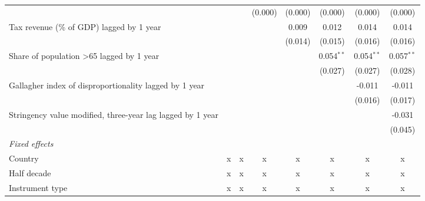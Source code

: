 \begin{tabular}{lccccccc}
                                                                                          &         &         & (0.000)      & (0.000)      & (0.000)      & (0.000)      & (0.000)\\   
   Tax revenue (\% of GDP) lagged by 1 year                                               &         &         &              & 0.009        & 0.012        & 0.014        & 0.014\\   
                                                                                          &         &         &              & (0.014)      & (0.015)      & (0.016)      & (0.016)\\   
   Share of population >65 lagged by 1 year                                               &         &         &              &              & 0.054$^{**}$ & 0.054$^{**}$ & 0.057$^{**}$\\   
                                                                                          &         &         &              &              & (0.027)      & (0.027)      & (0.028)\\   
   Gallagher index of disproportionality lagged by 1 year                                 &         &         &              &              &              & -0.011       & -0.011\\   
                                                                                          &         &         &              &              &              & (0.016)      & (0.017)\\   
   Stringency value modified, three-year lag lagged by 1 year                             &         &         &              &              &              &              & -0.031\\   
                                                                                          &         &         &              &              &              &              & (0.045)\\   
   \emph{Fixed effects}\\
   Country                                                                                & x       & x       & x            & x            & x            & x            & x\\  
   Half decade                                                                            & x       & x       & x            & x            & x            & x            & x\\  
   Instrument type                                                                        & x       & x       & x            & x            & x            & x            & x\\  

\end{tabular}
